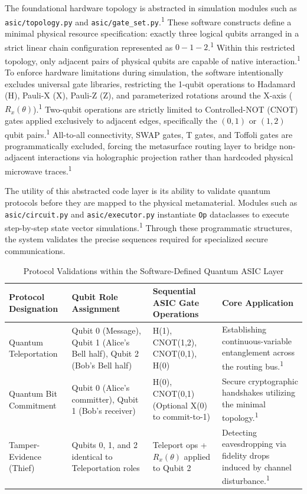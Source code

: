 \documentclass[11pt, a4paper]{article}
\begin{document}
The foundational hardware topology is abstracted in simulation modules such as \texttt{asic/topology.py} and \texttt{asic/gate\_set.py}.\textsuperscript{1} These software constructs define a minimal physical resource specification: exactly three logical qubits arranged in a strict linear chain configuration represented as $0 - 1 - 2$.\textsuperscript{1} Within this restricted topology, only adjacent pairs of physical qubits are capable of native interaction.\textsuperscript{1} To enforce hardware limitations during simulation, the software intentionally excludes universal gate libraries, restricting the 1-qubit operations to Hadamard (H), Pauli-X (X), Pauli-Z (Z), and parameterized rotations around the X-axis ($R_x(\theta)$).\textsuperscript{1} Two-qubit operations are strictly limited to Controlled-NOT (CNOT) gates applied exclusively to adjacent edges, specifically the $(0,1)$ or $(1,2)$ qubit pairs.\textsuperscript{1} All-to-all connectivity, SWAP gates, T gates, and Toffoli gates are programmatically excluded, forcing the metasurface routing layer to bridge non-adjacent interactions via holographic projection rather than hardcoded physical microwave traces.\textsuperscript{1}

The utility of this abstracted code layer is its ability to validate quantum protocols before they are mapped to the physical metamaterial. Modules such as \texttt{asic/circuit.py} and \texttt{asic/executor.py} instantiate \texttt{Op} dataclasses to execute step-by-step state vector simulations.\textsuperscript{1} Through these programmatic structures, the system validates the precise sequences required for specialized secure communications.

\begin{table}[htbp]
\centering
\renewcommand{\arraystretch}{1.5}
\begin{tabularx}{\textwidth}{>{\raggedright\arraybackslash}p{3cm} >{\raggedright\arraybackslash}X >{\raggedright\arraybackslash}X >{\raggedright\arraybackslash}X}
\toprule
\textbf{Protocol Designation} & \textbf{Qubit Role Assignment} & \textbf{Sequential ASIC Gate Operations} & \textbf{Core Application} \\
\midrule
Quantum Teleportation & Qubit 0 (Message), Qubit 1 (Alice's Bell half), Qubit 2 (Bob's Bell half) & H(1), CNOT(1,2), CNOT(0,1), H(0) & Establishing continuous-variable entanglement across the routing bus.\textsuperscript{1} \\
Quantum Bit Commitment & Qubit 0 (Alice's committer), Qubit 1 (Bob's receiver) & H(0), CNOT(0,1) (Optional X(0) to commit-to-1) & Secure cryptographic handshakes utilizing the minimal topology.\textsuperscript{1} \\
Tamper-Evidence (Thief) & Qubits 0, 1, and 2 identical to Teleportation roles & Teleport ops + $R_x(\theta)$ applied to Qubit 2 & Detecting eavesdropping via fidelity drops induced by channel disturbance.\textsuperscript{1} \\
\bottomrule
\end{tabularx}
\caption{Protocol Validations within the Software-Defined Quantum ASIC Layer}
\end{table}
\end{document}
